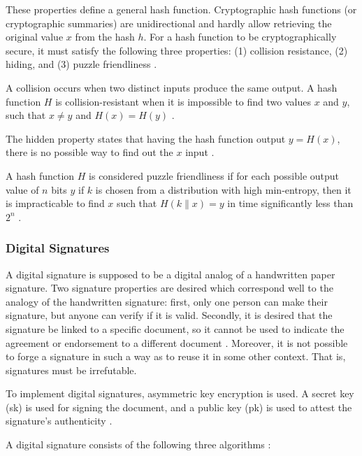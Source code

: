 These properties define a general hash function. Cryptographic hash functions (or cryptographic summaries) are unidirectional and hardly allow retrieving the original value $x$ from the hash $h$. For a hash function to be cryptographically secure, it must satisfy the following three properties: (1) collision resistance, (2) hiding, and (3) puzzle friendliness \cite{greve2018blockchain}.

A collision occurs when two distinct inputs produce the same output. A hash function $H$ is collision-resistant when it is impossible to find two values $x$ and $y$, such that $x \neq y$ and $H(x) = H(y)$ \cite{narayanan2016bitcoin}.

The hidden property states that having the hash function output $y = H (x)$, there is no possible way to find out the $x$ input \cite{greve2018blockchain}.

A hash function $H$ is considered puzzle friendliness if for each possible output value of $n$ bits $y$ if $k$ is chosen from a distribution with high min-entropy, then it is impracticable to find $x$ such that $H (k \| x) = y$ in time significantly less than $2^n$ \cite{narayanan2016bitcoin}.

\subsubsection{Digital Signatures}\label{sec:assinaturasDigitais}
A digital signature is supposed to be a digital analog of a handwritten paper signature. Two signature properties are desired which correspond well to the analogy of the handwritten signature: first, only one person can make their signature, but anyone can verify if it is valid. Secondly, it is desired that the signature be linked to a specific document, so it cannot be used to indicate the agreement or endorsement to a different document \cite{merkle1989certified}. Moreover, it is not possible to forge a signature in such a way as to reuse it in some other context. That is, signatures must be irrefutable.

To implement digital signatures, asymmetric key encryption is used. A secret key (sk) is used for signing the document, and a public key (pk) is used to attest the signature's authenticity \cite{greve2018blockchain}.

A digital signature consists of the following three algorithms \cite{narayanan2016bitcoin}:

